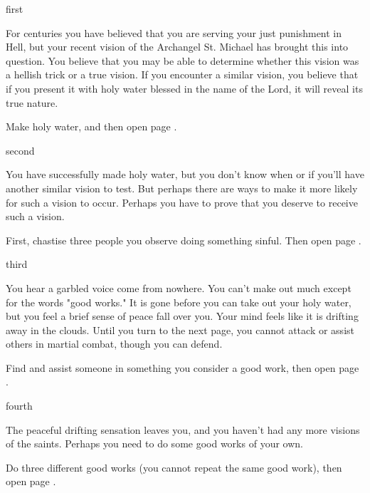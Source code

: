 \documentclass[greennotebook]{guildcamp4} %
\begin{document}
\startnotebook{\nJoanBooklet{}}

\begin{page}{first}

For centuries you have believed that you are serving your just punishment in Hell, but your recent vision of the Archangel St. Michael has brought this into question. You believe that you may be able to determine whether this vision was a hellish trick or a true vision. If you encounter a similar vision, you believe that if you present it with holy water blessed in the name of the Lord, it will reveal its true nature.

Make holy water, and then open page .

\end{page}

\begin{page}{second}

You have successfully made holy water, but you don't know when or if you'll have another similar vision to test. But perhaps there are ways to make it more likely for such a vision to occur. Perhaps you have to prove that you deserve to receive such a vision.

First, chastise three people you observe doing something sinful. Then open page .

\end{page}

\begin{page}{third}

You hear a garbled voice come from nowhere. You can't make out much except for the words "good works." It is gone before you can take out your holy water, but you feel a brief sense of peace fall over you. Your mind feels like it is drifting away in the clouds. Until you turn to the next page, you cannot attack or assist others in martial combat, though you can defend.

Find and assist someone in something you consider a good work, then open page .

\end{page}

\begin{page}{fourth}

The peaceful drifting sensation leaves you, and you haven't had any more visions of the saints. Perhaps you need to do some good works of your own.

Do three different good works (you cannot repeat the same good work), then open page .

\end{page}
\end{document}

